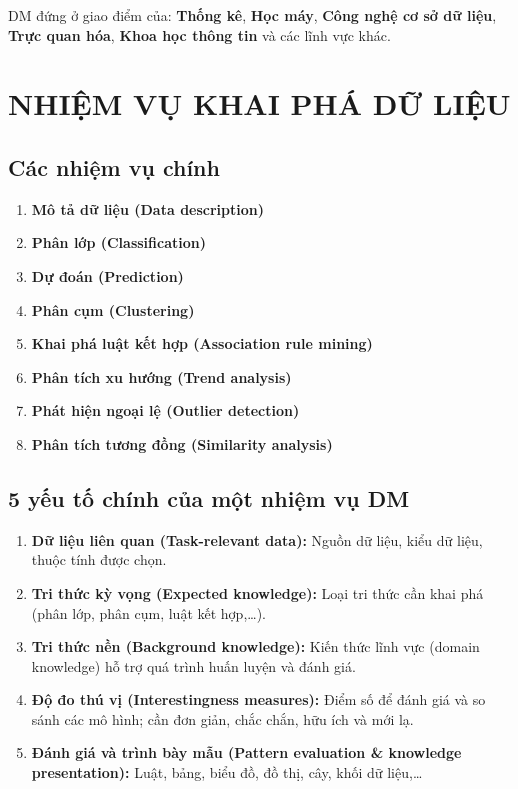\documentclass[10pt]{article}
\begin{document}
DM đứng ở giao điểm của: \textbf{Thống kê}, \textbf{Học máy}, \textbf{Công nghệ cơ sở dữ liệu}, \textbf{Trực quan hóa}, \textbf{Khoa học thông tin} và các lĩnh vực khác.

\section{NHIỆM VỤ KHAI PHÁ DỮ LIỆU}

\subsection{Các nhiệm vụ chính}

\begin{enumerate}
    \item \textbf{Mô tả dữ liệu (Data description)}
    \item \textbf{Phân lớp (Classification)}
    \item \textbf{Dự đoán (Prediction)}
    \item \textbf{Phân cụm (Clustering)}
    \item \textbf{Khai phá luật kết hợp (Association rule mining)}
    \item \textbf{Phân tích xu hướng (Trend analysis)}
    \item \textbf{Phát hiện ngoại lệ (Outlier detection)}
    \item \textbf{Phân tích tương đồng (Similarity analysis)}
\end{enumerate}

\subsection{5 yếu tố chính của một nhiệm vụ DM}

\begin{enumerate}
    \item \textbf{Dữ liệu liên quan (Task-relevant data):} Nguồn dữ liệu, kiểu dữ liệu, thuộc tính được chọn.
    \item \textbf{Tri thức kỳ vọng (Expected knowledge):} Loại tri thức cần khai phá (phân lớp, phân cụm, luật kết hợp,\ldots).
    \item \textbf{Tri thức nền (Background knowledge):} Kiến thức lĩnh vực (domain knowledge) hỗ trợ quá trình huấn luyện và đánh giá.
    \item \textbf{Độ đo thú vị (Interestingness measures):} Điểm số để đánh giá và so sánh các mô hình; cần đơn giản, chắc chắn, hữu ích và mới lạ.
    \item \textbf{Đánh giá và trình bày mẫu (Pattern evaluation \& knowledge presentation):} Luật, bảng, biểu đồ, đồ thị, cây, khối dữ liệu,\ldots
\end{enumerate}
\end{document}
